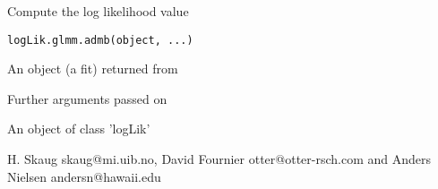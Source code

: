 \begin{Description}\relax
Compute the log likelihood value
\end{Description}
\begin{Usage}
\begin{verbatim}
logLik.glmm.admb(object, ...)
\end{verbatim}
\end{Usage}
\begin{Arguments}
\begin{ldescription}
\item[\code{object}] An object (a fit) returned from 
\item[\code{...}] Further arguments passed on
\end{ldescription}
\end{Arguments}
\begin{Value}
An object of class 'logLik'
\end{Value}
\begin{Author}\relax
H. Skaug skaug@mi.uib.no, David Fournier otter@otter-rsch.com and
Anders Nielsen andersn@hawaii.edu
\end{Author}
\begin{SeeAlso}\relax
{}
\end{SeeAlso}


